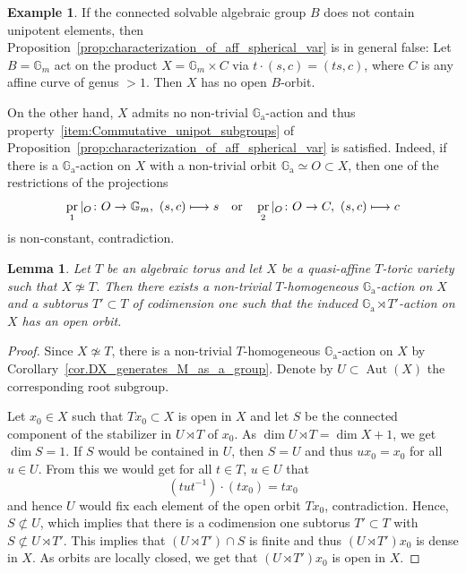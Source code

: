 \documentclass[JEP,XML,SOM,Unicode]{cedram}
\def\mto{\mathchoice{\longmapsto}{\mapsto}{\mapsto}{\mapsto}}
\newcommand{\ra}{\mathrm{a}}
\theoremstyle{plain}
\newtheorem{lemma}[theorem]{Lemma}
\theoremstyle{definition}
\newtheorem{example}[theorem]{Example}
\DeclareMathOperator{\pr}{pr}
\DeclareMathOperator{\Aut}{Aut}
\newcommand{\GG}{\mathbb{G}}
\begin{document}
\begin{example}
If the connected solvable algebraic group $B$ does not contain unipotent elements, then
Proposition~\ref{prop:characterization_of_aff_spherical_var} is in general false: Let
$B = \GG_m$ act on the product $X = \GG_m \times C$ via $t \cdot (s, c) = (ts, c)$, where $C$
is any affine curve of genus $> 1$. Then $X$ has no open $B$-orbit.

On the other hand,
$X$ admits no non-trivial $\GG_\ra$-action and thus
property~\eqref{item:Commutative_unipot_subgroups} of
Proposition~\ref{prop:characterization_of_aff_spherical_var} is satisfied.
Indeed, if there is a $\GG_\ra$-action on $X$ with a non-trivial orbit $\GG_\ra \simeq O \subset X$, then one of the restrictions
of the projections
\[
\pr_1 |_O \colon O \to \GG_m, \ (s, c) \mto s \quad \textrm{or} \quad
\pr_2 |_O \colon O \to C, \ (s, c) \mto c
\]
is non-constant, contradiction.
\end{example}

\begin{lemma}
\label{lem.open_orbit_of_solvable_group}
Let $T$ be an algebraic torus and let $X$ be a quasi-affine
$T$-toric variety such that $X \not\simeq T$.
Then there exists a non-trivial $T$-homogeneous $\GG_\ra$-action on $X$ and a
subtorus $T' \subset T$ of codimension one such that the induced
$\GG_\ra \rtimes T'$-action on $X$ has an open orbit.
\end{lemma}

\begin{proof}
Since $X \not\simeq T$,
there is a non-trivial $T$-homogeneous $\GG_\ra$-action on $X$
by Corollary~\ref{cor.DX_generates_M_as_a_group}. Denote by
$U \subset \Aut(X)$ the corresponding
root subgroup.

Let $x_0 \in X$ such that $T x_0 \subset X$ is open in $X$ and let
$S$ be the connected component of the stabilizer in $U \rtimes T$ of $x_0$.
As $\dim U \rtimes T = \dim X + 1$, we get $\dim S = 1$.
If $S$ would be contained in $U$,
then $S = U$ and thus
$u x_0 = x_0$ for all $u \in U$. From this we would get for all $t \in T$, $u \in U$ that
\[
(t u t^{-1}) \cdot (t x_0) = t x_0
\]
and hence $U$ would fix each element of the open orbit $T x_0$, contradiction.
Hence, \hbox{$S \!\not\subset\!U$}, which implies that there is a codimension one
subtorus $T' \subset T$ with $S \not\subset U \rtimes T'$. This implies that
$(U \rtimes T') \cap S$ is finite
and thus $(U \rtimes T') x_0$ is dense in $X$. As orbits are locally closed, we get that
$(U \rtimes T') x_0$ is open in $X$.
\end{proof}
\end{document}

